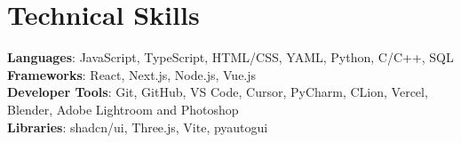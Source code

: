 \documentclass[letterpaper,11pt]{article}
\begin{document}
\section{Technical Skills}
 \begin{itemize}[leftmargin=0.15in, label={}]
    \small{\item{
     \textbf{Languages}{: JavaScript, TypeScript, HTML/CSS, YAML, Python, C/C++, SQL} \\
     \textbf{Frameworks}{: React, Next.js, Node.js, Vue.js} \\
     \textbf{Developer Tools}{: Git, GitHub, VS Code, Cursor, PyCharm, CLion, Vercel, Blender, Adobe Lightroom and Photoshop} \\
     \textbf{Libraries}{: shadcn/ui, Three.js, Vite, pyautogui}
    }}
 \end{itemize}
\end{document}
